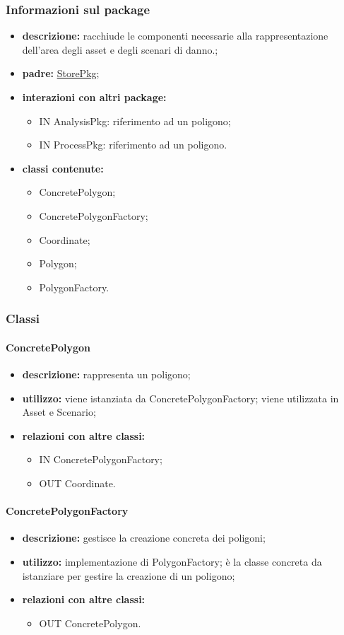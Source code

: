 \subsubsection{Informazioni sul package}
\begin{itemize}
	\item \textbf{descrizione:} racchiude le componenti necessarie alla rappresentazione dell'area degli asset e degli scenari di danno.;
	\item \textbf{padre:} \hyperref[pkg::StorePkg]{StorePkg};
	\item \textbf{interazioni con altri package:} 
	\begin{itemize}
		\item IN AnalysisPkg: riferimento ad un poligono;
		\item IN ProcessPkg: riferimento ad un poligono.
	\end{itemize}
	\item \textbf{classi contenute:}
	\begin{itemize}
		\item ConcretePolygon;
		\item ConcretePolygonFactory;
		\item Coordinate;
		\item Polygon;
		\item PolygonFactory.
	\end{itemize}
\end{itemize}
\subsubsection{Classi}
\paragraph{ConcretePolygon}
\begin{itemize}
	\item \textbf{descrizione:} rappresenta un poligono;
	\item \textbf{utilizzo:} viene istanziata da ConcretePolygonFactory; viene utilizzata in Asset e Scenario;
	\item \textbf{relazioni con altre classi:} 
	\begin{itemize}
		\item IN ConcretePolygonFactory;
		\item OUT Coordinate.
	\end{itemize}
\end{itemize}
\paragraph{ConcretePolygonFactory}
\begin{itemize}
	\item \textbf{descrizione:} gestisce la creazione concreta dei poligoni;
	\item \textbf{utilizzo:} implementazione di PolygonFactory; è la classe concreta da istanziare per gestire la creazione di un poligono;
	\item \textbf{relazioni con altre classi:} 
	\begin{itemize}
		\item OUT ConcretePolygon.
	\end{itemize}
\end{itemize}
